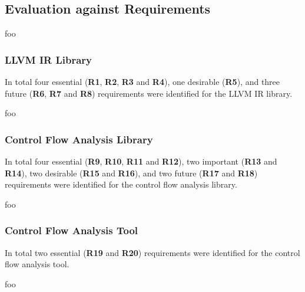 
\subsection{Evaluation against Requirements}

foo

\subsubsection{LLVM IR Library}

In total four essential (\textbf{R1}, \textbf{R2}, \textbf{R3} and \textbf{R4}), one desirable (\textbf{R5}), and three future (\textbf{R6}, \textbf{R7} and \textbf{R8}) requirements were identified for the LLVM IR library.

foo

\subsubsection{Control Flow Analysis Library}

In total four essential (\textbf{R9}, \textbf{R10}, \textbf{R11} and \textbf{R12}), two important (\textbf{R13} and \textbf{R14}), two desirable (\textbf{R15} and \textbf{R16}), and two future (\textbf{R17} and \textbf{R18}) requirements were identified for the control flow analysis library.

foo

\subsubsection{Control Flow Analysis Tool}

In total two essential (\textbf{R19} and \textbf{R20}) requirements were identified for the control flow analysis tool.

foo
